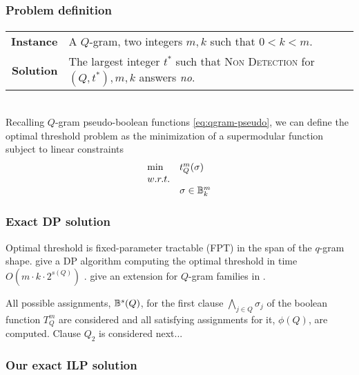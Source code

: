 \subsubsection{Problem definition}

\paragraph{}
\begin{tabular}{rl}
{\bf Instance}	&	A $Q$-gram, two integers $m,k$ such that $0 < k < m$.\\
{\bf Solution}	&	The largest integer $t^*$ such that \textsc{Non Detection} for $(Q,t^*),m,k$ answers \emph{no}.\\
\end{tabular}
\\

Recalling $Q$-gram pseudo-boolean functions \ref{eq:qgram-pseudo}, we can define the optimal threshold problem as the minimization of a supermodular function subject to linear constraints
\begin{equation}
\begin{array}{ll}
\text{min} & t_{Q}^{m} (\sigma)			\\
w.r.t.								\\
& \sigma \in \mathbb {B}^m_k				\\
\end{array}
\end{equation}

\subsubsection{Exact DP solution}

Optimal threshold is fixed-parameter tractable (FPT) in the span of the $q$-gram shape.
\citeauthor{Burkhardt2001} give a DP algorithm computing the optimal threshold in time $O(m \cdot k \cdot 2^{s(Q)})$ \citep{Burkhardt2001}.
\citeauthor{Kucherov2005} give an extension for $Q$-gram families in \citep{Kucherov2005}.

All possible assignments, \ie $\mathbb {B}^s(Q)$, for the first clause $\bigwedge_{j \in Q}{\sigma_j}$ of the boolean function $T_{Q}^{m}$ are considered and all satisfying assignments for it, \ie $\phi(Q)$, are computed.
Clause $Q_2$ is considered next...

\subsubsection{Our exact ILP solution}

